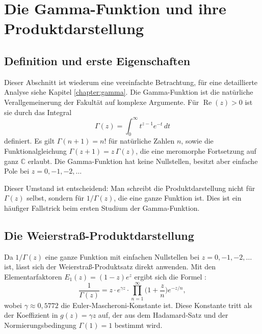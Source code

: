 %
%
%
%
\section{Die Gamma-Funktion und ihre Produktdarstellung}

\subsection{Definition und erste Eigenschaften}

Dieser Abschnitt ist wiederum eine vereinfachte Betrachtung, 
für eine detaillierte Analyse siehe Kapitel \ref{chapter:gamma}.
Die Gamma-Funktion ist die natürliche Verallgemeinerung der Fakultät
%
auf komplexe Argumente.
Für $\operatorname{Re}(z) > 0$ ist sie durch das Integral
\begin{equation}
\Gamma(z)
=
\int_0^{\infty} t^{z-1} e^{-t} \, dt
\end{equation}
%
definiert.
Es gilt $\Gamma(n+1) = n!$ für natürliche Zahlen $n$,
sowie die Funktionalgleichung $\Gamma(z+1) = z\,\Gamma(z)$,
die eine meromorphe Fortsetzung auf ganz $\mathbb{C}$ erlaubt.
Die Gamma-Funktion hat keine Nullstellen, besitzt aber einfache Pole
bei $z = 0, -1, -2, \ldots$

Dieser Umstand ist entscheidend:
Man schreibt die Produktdarstellung nicht für $\Gamma(z)$ selbst,
sondern für $1/\Gamma(z)$, die eine ganze Funktion ist.
Dies ist ein häufiger Fallstrick beim ersten Studium der Gamma-Funktion.

\subsection{Die Weierstraß-Produktdarstellung}

Da $1/\Gamma(z)$ eine ganze Funktion mit einfachen Nullstellen bei
$z = 0, -1, -2, \ldots$ ist, lässt sich der Weierstraß-Produktsatz
direkt anwenden.
Mit den Elementarfaktoren $E_1(z) = (1-z)e^z$ ergibt sich die Formel
\cite{produkt:steinShakarchi}:
\begin{equation}
\frac{1}{\Gamma(z)}
=
z \cdot e^{\gamma z} \cdot
\prod_{n=1}^{\infty} \biggl(1 + \frac{z}{n}\biggr) e^{-z/n},
\end{equation}
wobei $\gamma \approx 0{,}5772$ die Euler-Mascheroni-Konstante ist.
%
Diese Konstante tritt als der Koeffizient in $g(z) = \gamma z$ auf,
der aus dem Hadamard-Satz und der Normierungsbedingung $\Gamma(1) = 1$ bestimmt wird.

